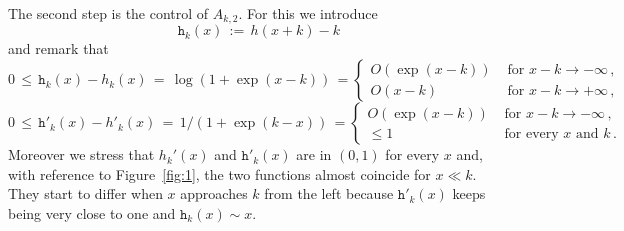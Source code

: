 \documentclass[reqno,11pt]{amsart}
\numberwithin{equation}{section}
\begin{document}
The second step is the control of  $A_{k,2}$. For this we 
introduce
\begin{equation}
\mathtt{h}_k(x)\, :=\, h(x+k)-k\, 
\end{equation}
 and remark that
 \begin{equation}
\label{eq:ident-before-asympt1}
0 \, \le \, \mathtt{h}_k(x)- h_k(x)\, =\, \log(1+ \exp(x-k))\,= \begin{cases}
O(\exp(x-k))& \text{ for } x-k\to -\infty\, , \\
O(x-k) & \text{ for } x-k\to +\infty\, ,
\end{cases}
\end{equation}
\begin{equation}
\label{eq:ident-before-asympt2}
0 \, \le \, \mathtt{h}'_k(x)- h'_k(x)\, =\, 1/(1+ \exp(k-x))\, = \begin{cases}
O(\exp(x-k))& \text{ for } x-k\to -\infty\, , \\
\le 1 & \text{ for every } x \text{ and } k\, .
\end{cases}
\end{equation}
 Moreover we stress that $h_k'(x)$ and $\mathtt{h}'_k(x)$ are in $(0,1)$ for every $x$ and, with reference to Figure~\ref{fig:1}, the two functions almost coincide for $x\ll k$. They start to differ when $x$ approaches $k$ from the left because  $\mathtt{h}'_k(x)$ keeps being very close to one and $\mathtt{h}_k(x)\sim x$. 
 
\end{document}
